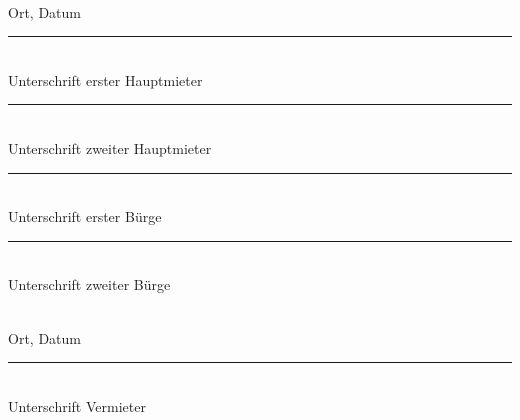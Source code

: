 \documentclass[10pt, a4paper]{letter}
\begin{document}
\begin{minipage}[t]{8.5cm}
    \TextField[name=ort_datum_mieter,width=8.5cm]{}\\
    Ort, Datum
    \vspace{3em} %

    \rule{8.5cm}{0.5pt} \\
    Unterschrift erster Hauptmieter
    \vspace{3em} %

    \rule{8.5cm}{0.5pt} \\
    Unterschrift zweiter Hauptmieter
    \vspace{3em} %

    \rule{8.5cm}{0.5pt} \\
    Unterschrift erster Bürge
    \vspace{3em} %

    \rule{8.5cm}{0.5pt} \\
    Unterschrift zweiter Bürge
\end{minipage}%
\hfill
\begin{minipage}[t]{8.5cm}
    \TextField[name=ort_datum_vermieter,width=8.5cm]{}\\
    Ort, Datum
    \vspace{3em} %

    \rule{8.5cm}{0.5pt} \\
    Unterschrift Vermieter
\end{minipage}
\end{document}

